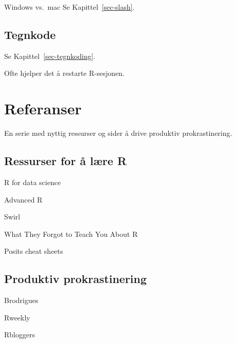 \documentclass[
  letterpaper,
  DIV=11,
  numbers=noendperiod]{scrreprt}
\begin{document}
Windows vs.~mac Se Kapittel~\ref{sec-slash}.

\hypertarget{tegnkode}{%
\section{Tegnkode}\label{tegnkode}}

Se Kapittel~\ref{sec-tegnkoding}.

Ofte hjelper det å restarte R-sesjonen.


\hypertarget{referanser}{%
\chapter*{Referanser}\label{referanser}}


En serie med nyttig ressurser og sider å drive produktiv
prokrastinering.

\hypertarget{ressurser-for-uxe5-luxe6re-r}{%
\section*{Ressurser for å lære R}\label{ressurser-for-uxe5-luxe6re-r}}


R for data science

Advanced R

Swirl

What They Forgot to Teach You About R

Posits cheat sheets

\hypertarget{produktiv-prokrastinering}{%
\section*{Produktiv prokrastinering}\label{produktiv-prokrastinering}}


Brodrigues

Rweekly

Rbloggers
\end{document}
